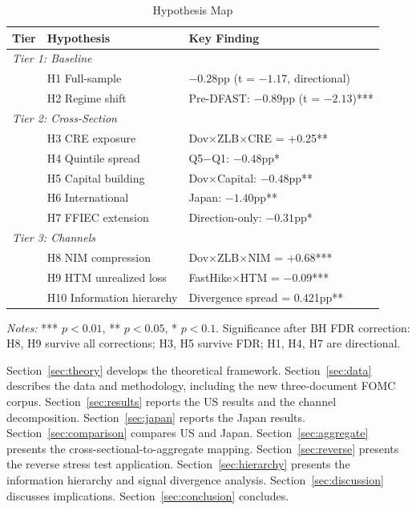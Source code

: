 \documentclass[12pt,a4paper]{article}
\begin{document}
\begin{table}[H]
\centering
\caption{Hypothesis Map}
\label{tab:hypomap}
\small
\begin{tabular}{lll}
\toprule
Tier & Hypothesis & Key Finding \\
\midrule
\multicolumn{3}{l}{\textit{Tier 1: Baseline}} \\
& H1 Full-sample & $-0.28$pp (t = $-1.17$, directional) \\
& H2 Regime shift & Pre-DFAST: $-0.89$pp (t = $-2.13$)*** \\
\midrule
\multicolumn{3}{l}{\textit{Tier 2: Cross-Section}} \\
& H3 CRE exposure & Dov$\times$ZLB$\times$CRE = +0.25** \\
& H4 Quintile spread & Q5$-$Q1: $-0.48$pp* \\
& H5 Capital building & Dov$\times$Capital: $-0.48$pp** \\
& H6 International & Japan: $-1.40$pp** \\
& H7 FFIEC extension & Direction-only: $-0.31$pp* \\
\midrule
\multicolumn{3}{l}{\textit{Tier 3: Channels}} \\
& H8 NIM compression & Dov$\times$ZLB$\times$NIM = +0.68*** \\
& H9 HTM unrealized loss & FastHike$\times$HTM = $-0.09$*** \\
& H10 Information hierarchy & Divergence spread = 0.421pp** \\
\bottomrule
\end{tabular}
\end{table}
\noindent\textit{Notes:} *** $p<0.01$, ** $p<0.05$, * $p<0.1$. Significance after BH FDR correction: H8, H9 survive all corrections; H3, H5 survive FDR; H1, H4, H7 are directional.

Section~\ref{sec:theory} develops the theoretical framework. Section~\ref{sec:data} describes the data and methodology, including the new three-document FOMC corpus. Section~\ref{sec:results} reports the US results and the channel decomposition. Section~\ref{sec:japan} reports the Japan results. Section~\ref{sec:comparison} compares US and Japan. Section~\ref{sec:aggregate} presents the cross-sectional-to-aggregate mapping. Section~\ref{sec:reverse} presents the reverse stress test application. Section~\ref{sec:hierarchy} presents the information hierarchy and signal divergence analysis. Section~\ref{sec:discussion} discusses implications. Section~\ref{sec:conclusion} concludes.
\end{document}
